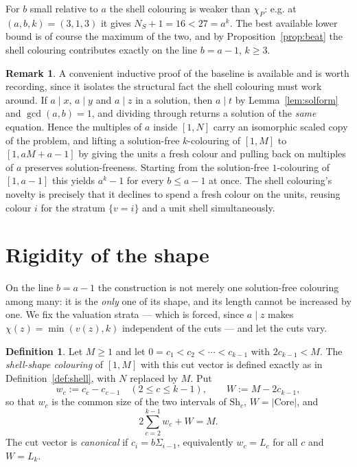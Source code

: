 \documentclass{amsart}
\theoremstyle{definition}
\newtheorem{definition}[theorem]{Definition}
\newtheorem{remark}[theorem]{Remark}
\newcommand{\Sh}{\mathrm{Sh}}
\newcommand{\Core}{\mathrm{Core}}
\begin{document}
For $b$ small relative to $a$ the shell colouring is weaker than $\chi_P$: e.g.
at $(a,b,k)=(3,1,3)$ it gives $N_S+1=16<27=a^{k}$.  The best available lower
bound is of course the maximum of the two, and by Proposition~\ref{prop:beat}
the shell colouring contributes exactly on the line $b=a-1$, $k\ge3$.

\begin{remark}
A convenient inductive proof of the baseline is available and is worth
recording, since it isolates the structural fact the shell colouring must work
around.  If $a\mid x$, $a\mid y$ and $a\mid z$ in a solution, then $a\mid t$ by
Lemma~\ref{lem:solform} and $\gcd(a,b)=1$, and dividing through returns a
solution of the \emph{same} equation.  Hence the multiples of $a$ inside
$[1,N]$ carry an isomorphic scaled copy of the problem, and lifting a
solution-free $k$-colouring of $[1,M]$ to $[1,aM+a-1]$ by giving the units a
fresh colour and pulling back on multiples of $a$ preserves solution-freeness.
Starting from the solution-free $1$-colouring of $[1,a-1]$ this yields
$a^{k}-1$ for every $b\le a-1$ at once.  The shell colouring's novelty is
precisely that it declines to spend a fresh colour on the units, reusing colour
$i$ for the stratum $\{v=i\}$ and a unit shell simultaneously.
\end{remark}

\section{Rigidity of the shape}\label{sec:rigid}

On the line $b=a-1$ the construction is not merely one solution-free colouring
among many: it is the \emph{only} one of its shape, and its length cannot be
increased by one.  We fix the valuation strata --- which is forced, since
$a\mid z$ makes $\chi(z)=\min(v(z),k)$ independent of the cuts --- and let the
cuts vary.

\begin{definition}\label{def:shape}
Let $M\ge1$ and let $0=c_1<c_2<\cdots<c_{k-1}$ with $2c_{k-1}<M$.  The
\emph{shell-shape colouring} of $[1,M]$ with this cut vector is defined exactly
as in Definition~\ref{def:shell}, with $N$ replaced by $M$.  Put
\[
  w_c:=c_c-c_{c-1}\quad(2\le c\le k-1),\qquad W:=M-2c_{k-1},
\]
so that $w_c$ is the common size of the two intervals of $\Sh_c$, $W=|\Core|$,
and
\begin{equation}\label{eq:budget}
  2\sum_{c=2}^{k-1}w_c+W=M .
\end{equation}
The cut vector is \emph{canonical} if $c_i=b\Sigma_{i-1}$, equivalently
$w_c=L_c$ for all $c$ and $W=L_k$.
\end{definition}
\end{document}
